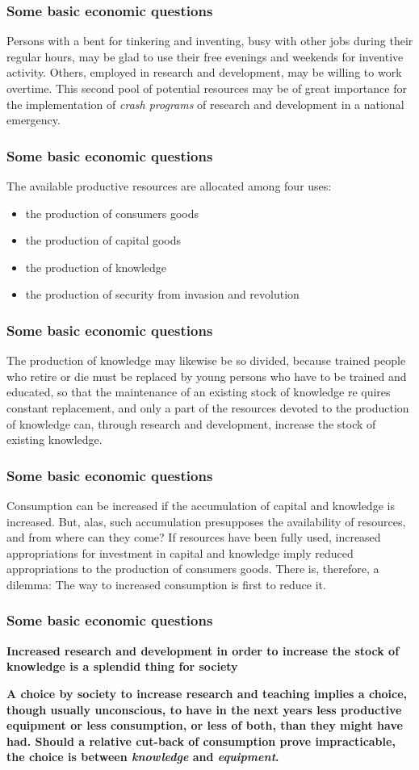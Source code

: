 \begin{frame}
\frametitle{Some basic economic questions}
Persons with a bent for tinkering and inventing, busy with other jobs during their regular hours, may be glad to use their free evenings and weekends for inventive activity. Others, employed in research and development, may be willing to work overtime. This second pool of potential resources may be of great importance for the implementation of \textit{crash programs} of research and development in a national emergency.
\end{frame}

\begin{frame}
\frametitle{Some basic economic questions}
The available productive resources are allocated among four uses:
\begin{itemize}
	\item the production of consumers goods
    \item the production of capital goods
    \item the production of knowledge
    \item the production of security from invasion and revolution
\end{itemize}
\end{frame}

\begin{frame}
\frametitle{Some basic economic questions}
The production of knowledge may likewise be so divided, because trained people who retire or die must be replaced by young persons who have to be trained and educated, so that the maintenance of an existing stock of knowledge re quires constant replacement, and only a part of the resources devoted to the production of knowledge can, through research and development, increase the stock of existing knowledge.
\end{frame}

\begin{frame}
\frametitle{Some basic economic questions}
Consumption can be increased if the accumulation of capital and knowledge is increased. But, alas, such accumulation presupposes the availability of resources, and from where can they come? If resources have been fully used, increased appropriations for investment in capital and knowledge imply reduced appropriations to the production of consumers goods. There is, therefore, a dilemma: The way to increased consumption is first to reduce it.
\end{frame}

\begin{frame}
\frametitle{Some basic economic questions}
\textbf{Increased research and development in order to increase the stock of knowledge is a splendid thing for society}

\textbf{A choice by society to increase research and teaching implies a choice, though usually unconscious, to have in the next years less productive equipment or less consumption, or less of both, than they might have had. Should a relative cut-back of consumption prove impracticable, the choice is between \textit{knowledge} and \textit{equipment}.}
\end{frame}

